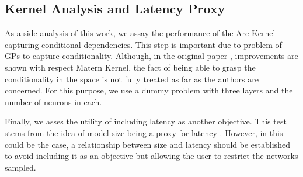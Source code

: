 \documentclass[a4paper, twocolumn]{article}
\begin{document}
\subsection{Kernel Analysis and Latency Proxy}\label{analysis}

As a side analysis of this work, we assay the performance of the Arc Kernel capturing conditional dependencies. This step is important due to problem of GPs to capture conditionality. Although, in the original paper \cite{Swersky2014}, improvements are shown with respect Matern Kernel, the fact of being able to grasp the conditionality in the space is not fully treated as far as the authors are concerned. For this purpose, we use a dummy problem with three layers and the number of neurons in each. 

Finally, we asses the utility of including latency as another objective. This test stems from the idea of model size being a proxy for latency \cite{Loni2020}. However, in this could be the case, a relationship between size and latency should be established to avoid including it as an objective but allowing the user to restrict the networks sampled.
\end{document}
